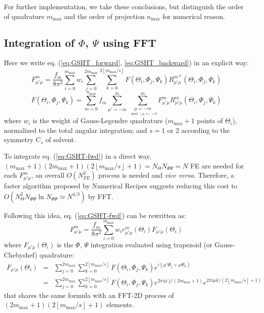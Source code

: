For further implementation, we take these conclusions, but distinguish
the order of quadrature $m_{\mathrm{max}}$ and the order of projection
$n_{\mathrm{max}}$ for numerical reason.

\subsection{Integration of $\Phi$, $\Psi$ using FFT}

Here we write eq. (\ref{eq:GSHT_forward}, \ref{eq:GSHT_backward})
in an explicit way:
\begin{equation}
F_{\mu'\mu}^{m}=\frac{f_{m}}{8\pi^{2}}\sum_{i=0}^{m_{\mathrm{max}}}w_{i}\sum_{j=0}^{2m_{\mathrm{max}}}\sum_{k=0}^{2\left\lfloor m_{\mathrm{max}}/s\right\rfloor }F(\Theta_{i},\Phi_{j},\Psi_{k})R_{\mu'\mu}^{m*}(\Theta_{i},\Phi_{j},\Psi_{k})\label{eq:GSHT-fwd}
\end{equation}
\begin{equation}
F(\Theta_{i},\Phi_{j},\Psi_{k})=\sum_{m=0}^{n_{\mathrm{max}}}f_{m}\sum_{\mu'=-m}^{m}\sum_{\underset{\mod(\mu,s)=0}{\mu=-m}}^{m}F_{\mu'\mu}^{m}R_{\mu'\mu}^{m}(\Theta_{i},\Phi_{j},\Psi_{k})\label{eq:GSHT-bwd}
\end{equation}
where $w_{i}$ is the weight of Gauss-Legendre quadrature ($m_{\mathrm{max}}+1$
points of $\Theta_{i}$), normalized to the total angular integration;
and $s=1$ or 2 according to the symmetry $\mathrm{C}_{s}$ of solvent.

To integrate eq. (\ref{eq:GSHT-fwd}) in a direct way, $(m_{\mathrm{max}}+1)(2m_{\mathrm{max}}+1)(2\left\lfloor m_{\mathrm{max}}/s\right\rfloor +1)=N_{\Theta}N_{\Phi\Psi}=N$
\acs{FE} are needed for each $F_{\mu'\mu}^{m}$, an overall $O(N_{FE}^{2})$
process is needed and \textit{vice versa}. Therefore, a faster algorithm
proposed by Numerical Recipes \citep{Numerical_Recipes_3ed} suggests
reducing this cost to $O(N_{\Theta}^{2}N_{\Phi\Psi}\ln N_{\Phi\Psi}\simeq N^{4/3})$
by \acs{FFT}.

Following this idea, eq. (\ref{eq:GSHT-fwd}) can be rewritten as:
\begin{equation}
F_{\mu'\mu}^{m}=\frac{f_{m}}{8\pi^{2}}\sum_{i=0}^{m_{\mathrm{max}}}w_{i}r_{\mu'\mu}^{m}(\Theta_{i})F_{\mu'\mu}(\Theta_{i})
\end{equation}
where $F_{\mu'\mu}(\Theta_{i})$ is the $\Phi$, $\Psi$ integration
evaluated using trapezoid (or Gauss-Chebyshef) quadrature:
\begin{eqnarray}
F_{\mu'\mu}(\Theta_{i}) & = & \sum_{j=0}^{2m_{\mathrm{max}}}\sum_{k=0}^{2\left\lfloor m_{\mathrm{max}}/s\right\rfloor }F(\Theta_{i},\Phi_{j},\Psi_{k})e^{i(\mu'\Phi_{j}+\mu\Psi_{k})}\label{eq:f_mup_mu}\\
 & = & \sum_{j=0}^{2m_{\mathrm{max}}}\sum_{k=0}^{2\left\lfloor m_{\mathrm{max}}/s\right\rfloor }F(\Theta_{i},\Phi_{j},\Psi_{k})e^{2\pi i\mu'j/(2m_{\mathrm{max}}+1)}e^{2\pi i\mu k/(2\left\lfloor m_{\mathrm{max}}/s\right\rfloor +1)}\nonumber 
\end{eqnarray}
that shares the same formula with an \acs{FFT}-2D process of $\left(2m_{\mathrm{max}}+1\right)\left(2\left\lfloor m_{\mathrm{max}}/s\right\rfloor +1\right)$
elements.

